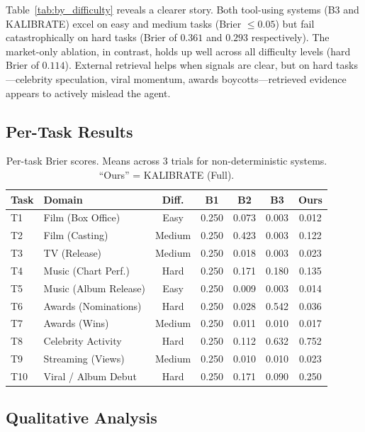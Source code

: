 \documentclass{article} %
\newcommand{\agentname}{KALIBRATE}
\begin{document}
Table~\ref{tab:by_difficulty} reveals a clearer story. Both tool-using systems (B3 and \agentname{}) excel on easy and medium tasks (Brier $\le 0.05$) but fail catastrophically on hard tasks (Brier of $0.361$ and $0.293$ respectively). The market-only ablation, in contrast, holds up well across all difficulty levels (hard Brier of $0.114$). External retrieval helps when signals are clear, but on hard tasks---celebrity speculation, viral momentum, awards boycotts---retrieved evidence appears to actively mislead the agent.

\subsection{Per-Task Results}

\begin{table}[t]
\centering
\caption{Per-task Brier scores. Means across 3 trials for non-deterministic systems. ``Ours'' = \agentname{} (Full).}
\label{tab:per_task}
\begin{tabular}{llccccc}
\toprule
\textbf{Task} & \textbf{Domain} & \textbf{Diff.} & \textbf{B1} & \textbf{B2} & \textbf{B3} & \textbf{Ours} \\
\midrule
T1 & Film (Box Office)     & Easy   & 0.250 & 0.073 & 0.003 & 0.012 \\
T2 & Film (Casting)        & Medium & 0.250 & 0.423 & 0.003 & 0.122 \\
T3 & TV (Release)          & Medium & 0.250 & 0.018 & 0.003 & 0.023 \\
T4 & Music (Chart Perf.)   & Hard   & 0.250 & 0.171 & 0.180 & 0.135 \\
T5 & Music (Album Release) & Easy   & 0.250 & 0.009 & 0.003 & 0.014 \\
T6 & Awards (Nominations)  & Hard   & 0.250 & 0.028 & 0.542 & 0.036 \\
T7 & Awards (Wins)         & Medium & 0.250 & 0.011 & 0.010 & 0.017 \\
T8 & Celebrity Activity    & Hard   & 0.250 & 0.112 & 0.632 & 0.752 \\
T9 & Streaming (Views)     & Medium & 0.250 & 0.010 & 0.010 & 0.023 \\
T10 & Viral / Album Debut  & Hard   & 0.250 & 0.171 & 0.090 & 0.250 \\
\bottomrule
\end{tabular}
\end{table}

\subsection{Qualitative Analysis}
\end{document}
